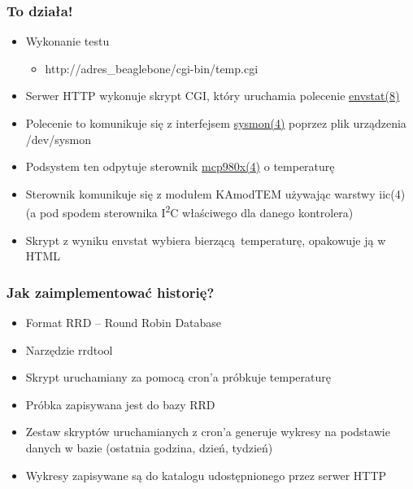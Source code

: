 \documentclass[dvipsnames,table]{beamer}
\begin{document}
\begin{frame}
\frametitle{To działa!}
\begin{itemize}
	\item Wykonanie testu
	\begin{itemize}
		\item http://adres\_beaglebone/cgi-bin/temp.cgi
	\end{itemize}
	\item Serwer HTTP wykonuje skrypt CGI, który uruchamia polecenie \href{http://netbsd.gw.com/cgi-bin/man-cgi?envstat++NetBSD-current}{envstat(8)}
	\item Polecenie to komunikuje się z interfejsem \href{http://netbsd.gw.com/cgi-bin/man-cgi?sysmon++NetBSD-current}{sysmon(4)} poprzez plik urządzenia /dev/sysmon
	\item Podsystem ten odpytuje sterownik \href{http://netbsd.gw.com/cgi-bin/man-cgi?mcp980x++NetBSD-current}{mcp980x(4)} o temperaturę
	\item Sterownik komunikuje się z modułem KAmodTEM używając warstwy iic(4) (a pod spodem sterownika  I\textsuperscript{2}C właściwego dla danego kontrolera)
	\item Skrypt z wyniku envstat wybiera bierzącą temperaturę, opakowuje ją w HTML
\end{itemize}
\end{frame}

\begin{frame}
\frametitle{Jak zaimplementować historię?}
\begin{itemize}
	\item Format RRD -- Round Robin Database
	\item Narzędzie rrdtool
	\item Skrypt uruchamiany za pomocą cron'a próbkuje temperaturę
	\item Próbka zapisywana jest do bazy RRD
	\item Zestaw skryptów uruchamianych z cron'a generuje wykresy na podstawie danych w bazie (ostatnia godzina, dzień, tydzień)
	\item Wykresy zapisywane są do katalogu udostępnionego przez serwer HTTP
\end{itemize}
\end{frame}

\end{document}
